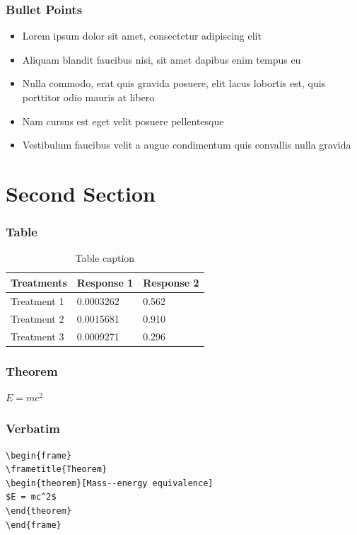 \documentclass{beamer}
\begin{document}
\begin{frame}
\frametitle{Bullet Points}
\begin{itemize}
\item Lorem ipsum dolor sit amet, consectetur adipiscing elit
\item Aliquam blandit faucibus nisi, sit amet dapibus enim tempus eu
\item Nulla commodo, erat quis gravida posuere, elit lacus lobortis est, quis porttitor odio mauris at libero
\item Nam cursus est eget velit posuere pellentesque
\item Vestibulum faucibus velit a augue condimentum quis convallis nulla gravida
\end{itemize}
\end{frame}




\section{Second Section}

\begin{frame}
\frametitle{Table}
\begin{table}
\begin{tabular}{l l l}
\toprule
\textbf{Treatments} & \textbf{Response 1} & \textbf{Response 2}\\
\midrule
Treatment 1 & 0.0003262 & 0.562 \\
Treatment 2 & 0.0015681 & 0.910 \\
Treatment 3 & 0.0009271 & 0.296 \\
\bottomrule
\end{tabular}
\caption{Table caption}
\end{table}
\end{frame}


\begin{frame}
\frametitle{Theorem}
\begin{theorem}
$E = mc^2$
\end{theorem}
\end{frame}


\begin{frame}[fragile] %
\frametitle{Verbatim}
\begin{example}
\begin{verbatim}
\begin{frame}
\frametitle{Theorem}
\begin{theorem}[Mass--energy equivalence]
$E = mc^2$
\end{theorem}
\end{frame}\end{verbatim}
\end{example}
\end{frame}
\end{document}
